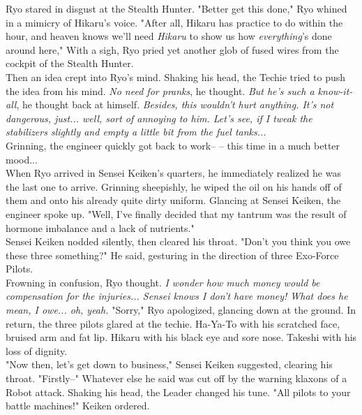 \documentclass[11pt,twoside,a4paper]{book}
\begin{document}
\begin{multicols*}{2}
Ryo stared in disgust at the Stealth Hunter. "Better get this done," Ryo whined in a mimicry of Hikaru's voice. "After all, Hikaru has practice to do within the hour, and heaven knows we'll need \emph{Hikaru} to show us how \emph{everything}'s done around here," With a sigh, Ryo pried yet another glob of fused wires from the cockpit of the Stealth Hunter. ~\\

Then an idea crept into Ryo's mind. Shaking his head, the Techie tried to push the idea from his mind. \emph{No need for pranks}, he thought. \emph{But he's such a know-it-all}, he thought back at himself. \emph{Besides, this wouldn't hurt anything. It's not dangerous, just... well, sort of annoying to him. Let's see, if I tweak the stabilizers slightly and empty a little bit from the fuel tanks...} ~\\

Grinning, the engineer quickly got back to work-- -- this time in a much better mood... ~\\

When Ryo arrived in Sensei Keiken's quarters, he immediately realized he was the last one to arrive. Grinning sheepishly, he wiped the oil on his hands off of them and onto his already quite dirty uniform. Glancing at Sensei Keiken, the engineer spoke up. "Well, I've finally decided that my tantrum was the result of hormone imbalance and a lack of nutrients." ~\\

Sensei Keiken nodded silently, then cleared his throat. "Don't you think you owe these three something?" He said, gesturing in the direction of three Exo-Force Pilots. ~\\

Frowning in confusion, Ryo thought. \emph{I wonder how much money would be compensation for the injuries... Sensei knows I don't have money! What does he mean, I owe... oh, yeah.} "Sorry," Ryo apologized, glancing down at the ground. In return, the three pilots glared at the techie. Ha-Ya-To with his scratched face, bruised arm and fat lip. Hikaru with his black eye and sore nose. Takeshi with his loss of dignity. ~\\

"Now then, let's get down to business," Sensei Keiken suggested, clearing his throat. "Firstly--" Whatever else he said was cut off by the warning klaxons of a Robot attack. Shaking his head, the Leader changed his tune. "All pilots to your battle machines!" Keiken ordered. ~\\


\end{multicols*}
\end{document}
